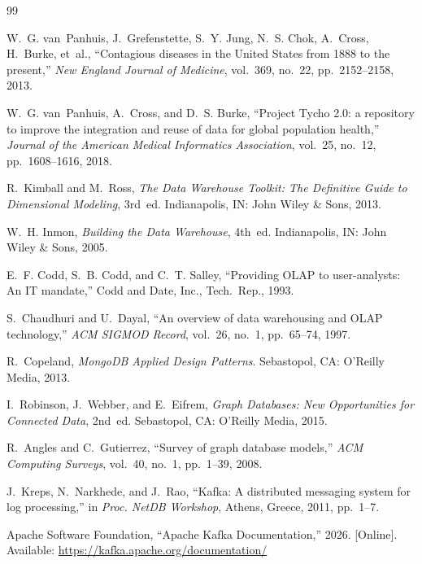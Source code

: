 \documentclass[12pt,a4paper]{article}
\begin{document}
\newpage
\begin{thebibliography}{99}
\setlength{\itemsep}{4pt}

W.~G. van~Panhuis, J.~Grefenstette, S.~Y. Jung, N.~S. Chok, A.~Cross, H.~Burke, et~al., ``Contagious diseases in the United States from 1888 to the present,'' \textit{New England Journal of Medicine}, vol.~369, no.~22, pp.~2152--2158, 2013.

W.~G. van~Panhuis, A.~Cross, and D.~S. Burke, ``Project Tycho 2.0: a repository to improve the integration and reuse of data for global population health,'' \textit{Journal of the American Medical Informatics Association}, vol.~25, no.~12, pp.~1608--1616, 2018.

R.~Kimball and M.~Ross, \textit{The Data Warehouse Toolkit: The Definitive Guide to Dimensional Modeling}, 3rd~ed. Indianapolis, IN: John Wiley \& Sons, 2013.

W.~H. Inmon, \textit{Building the Data Warehouse}, 4th~ed. Indianapolis, IN: John Wiley \& Sons, 2005.

E.~F. Codd, S.~B. Codd, and C.~T. Salley, ``Providing OLAP to user-analysts: An IT mandate,'' Codd and Date, Inc., Tech.~Rep., 1993.

S.~Chaudhuri and U.~Dayal, ``An overview of data warehousing and OLAP technology,'' \textit{ACM SIGMOD Record}, vol.~26, no.~1, pp.~65--74, 1997.

R.~Copeland, \textit{MongoDB Applied Design Patterns}. Sebastopol, CA: O'Reilly Media, 2013.

I.~Robinson, J.~Webber, and E.~Eifrem, \textit{Graph Databases: New Opportunities for Connected Data}, 2nd~ed. Sebastopol, CA: O'Reilly Media, 2015.

R.~Angles and C.~Gutierrez, ``Survey of graph database models,'' \textit{ACM Computing Surveys}, vol.~40, no.~1, pp.~1--39, 2008.

J.~Kreps, N.~Narkhede, and J.~Rao, ``Kafka: A distributed messaging system for log processing,'' in \textit{Proc. NetDB Workshop}, Athens, Greece, 2011, pp.~1--7.

Apache Software Foundation, ``Apache Kafka Documentation,'' 2026. [Online]. Available: \url{https://kafka.apache.org/documentation/}


\end{thebibliography}
\end{document}
